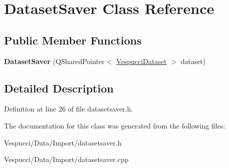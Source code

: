 \hypertarget{class_dataset_saver}{}\section{Dataset\+Saver Class Reference}
\label{class_dataset_saver}
\subsection*{Public Member Functions}
\begin{DoxyCompactItemize}
\item 
{\bfseries Dataset\+Saver} (Q\+Shared\+Pointer$<$ \hyperlink{class_vespucci_dataset}{Vespucci\+Dataset} $>$ dataset)\hypertarget{class_dataset_saver_a544eaca6a91a4943e053b0a53477d9b6}{}\label{class_dataset_saver_a544eaca6a91a4943e053b0a53477d9b6}

\end{DoxyCompactItemize}


\subsection{Detailed Description}


Definition at line 26 of file datasetsaver.\+h.



The documentation for this class was generated from the following files\+:\begin{DoxyCompactItemize}
\item 
Vespucci/\+Data/\+Import/datasetsaver.\+h\item 
Vespucci/\+Data/\+Import/datasetsaver.\+cpp\end{DoxyCompactItemize}
